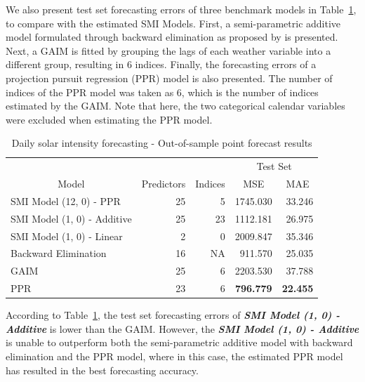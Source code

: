 \documentclass[11pt,a4paper,]{article}
\begin{document}
We also present test set forecasting errors of three benchmark models in
Table~\ref{tbl-solar}, to compare with the estimated SMI Models. First,
a semi-parametric additive model formulated through backward elimination
as proposed by \textcite{FH2012} is presented. Next, a GAIM is fitted by
grouping the lags of each weather variable into a different group,
resulting in 6 indices. Finally, the forecasting errors of a projection
pursuit regression (PPR) model is also presented. The number of indices
of the PPR model was taken as 6, which is the number of indices
estimated by the GAIM. Note that here, the two categorical calendar
variables were excluded when estimating the PPR model.

\hypertarget{tbl-solar}{}
\begin{table}[!h]
\caption{\label{tbl-solar}Daily solar intensity forecasting - Out-of-sample point forecast results }\tabularnewline

\centering
\begin{tabular}{lrr>{}r>{}r}
\toprule
\multicolumn{1}{c}{} & \multicolumn{1}{c}{} & \multicolumn{1}{c}{} & \multicolumn{2}{c}{Test Set} \\
\cmidrule(l{3pt}r{3pt}){4-5}
\multicolumn{1}{c}{Model} & \multicolumn{1}{c}{Predictors} & \multicolumn{1}{c}{Indices} & \multicolumn{1}{c}{MSE} & \multicolumn{1}{c}{MAE}\\
\midrule
SMI Model (12, 0) - PPR & 25 & 5 & 1745.030 & 33.246\\
SMI Model (1, 0) - Additive & 25 & 23 & 1112.181 & 26.975\\
SMI Model (1, 0) - Linear & 2 & 0 & 2009.847 & 35.346\\
Backward Elimination & 16 & NA & 911.570 & 25.035\\
GAIM & 25 & 6 & 2203.530 & 37.788\\
\addlinespace
PPR & 23 & 6 & \textbf{796.779} & \textbf{22.455}\\
\bottomrule
\end{tabular}
\end{table}

According to Table~\ref{tbl-solar}, the test set forecasting errors of
\textbf{\emph{SMI Model (1, 0) - Additive}} is lower than the GAIM.
However, the \textbf{\emph{SMI Model (1, 0) - Additive}} is unable to
outperform both the semi-parametric additive model with backward
elimination and the PPR model, where in this case, the estimated PPR
model has resulted in the best forecasting accuracy.
\end{document}
